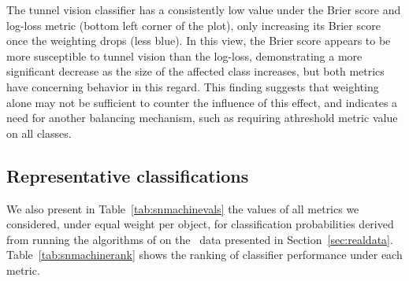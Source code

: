 The tunnel vision classifier has a consistently low value under the Brier score and log-loss metric (bottom left corner of the plot), only increasing its Brier score once the weighting drops (less blue).
In this view, the Brier score appears to be more susceptible to tunnel vision than the log-loss, demonstrating a more significant decrease as the size of the affected class increases, but both metrics have concerning behavior in this regard.
This finding suggests that weighting alone may not be sufficient to counter the influence of this effect, and indicates a need for another balancing mechanism, such as requiring athreshold metric value on all classes.



\subsection{Representative classifications}
\label{sec:realresults}

We also present in Table~\ref{tab:snmachinevals} the values of all metrics we considered, under equal weight per object, for classification probabilities derived from running the algorithms of \cite{lochner_photometric_2016} on the \snphotcc\ data presented in Section~\ref{sec:realdata}.
Table~\ref{tab:snmachinerank} shows the ranking of classifier performance under each metric.

